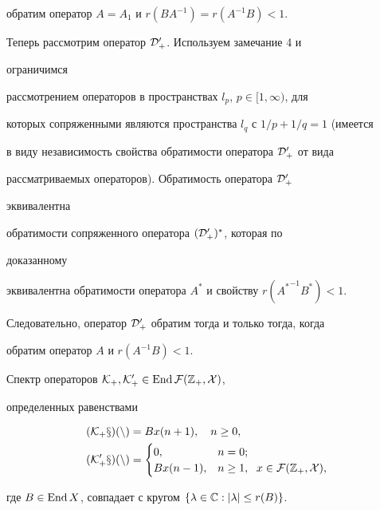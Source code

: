 \begin{pf}
обратим оператор $A=A_1$ и $r(B A^{-1})=r(A^{-1}B)<1$. 


 


Теперь рассмотрим оператор $\cal D^0_+$. Используем замечание 4 и 


ограничимся 


рассмотрением операторов в пространствах $l_p$, $p\in[1,\infty)$, для 


которых сопряженными являются пространства $l_q$ с $1/p+1/q=1$ (имеется 


в виду независимость свойства обратимости оператора $\cal D^0_+$ от вида 


рассматриваемых операторов). Обратимость оператора $\cal D^0_+$ 


эквивалентна 


обратимости сопряженного оператора $(\cal D^0_+)^*$, которая по 


доказанному 


эквивалентна обратимости оператора $A^*$ и свойству $r({A^*}^{-1}B^*)<1$. 


Следовательно, оператор $\cal D^0_+$ обратим тогда и только тогда, когда 


обратим оператор $A$ и $r(A^{-1}B)<1$. 


\end{pf} 


 


\begin{cor} 


Спектр операторов $\cal K_+,\cal K^0_+\in\operatorname{End}\cal F(\Bbb Z_+,X)$, 


определенных равенствами 


\begin{align*} 


(\cal K_+x)(n)&=B x(n+1),\quad n\ge0,\\ 


(\cal K^0_+x)(n)&= 


\begin{cases} 


0, & n=0;\\ 


B x(n-1), & n\ge 1,\ \; x\in\cal F(\Bbb Z_+,X), 


\end{cases} 


\end{align*} 


где $B\in\End X$, совпадает с кругом $\{\lambda\in\Bbb C:|\lambda|\le 


r(B)\}$. 


\end{cor} 



